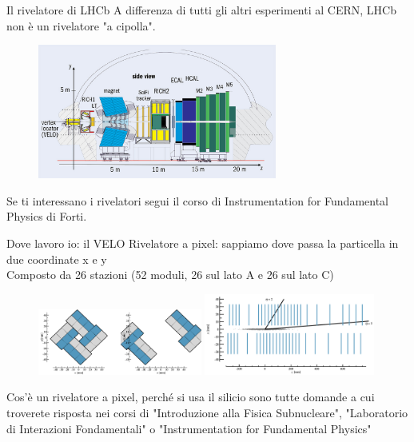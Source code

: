 \documentclass[
10pt,
aspectratio=169,
]{beamer}
\begin{document}
\begin{frame}{Il rivelatore di LHCb}
A differenza di tutti gli altri esperimenti al CERN, LHCb non è un rivelatore "a cipolla".
\begin{figure}
    \centering
    \includegraphics[width=0.7\textwidth]{figures/detector.jpeg}
\end{figure}    
Se ti interessano i rivelatori segui il corso di Instrumentation for Fundamental Physics di Forti.
\end{frame}

\begin{frame}{Dove lavoro io: il VELO}
    Rivelatore a pixel: sappiamo dove passa la particella in due coordinate x e y\\
    Composto da 26 stazioni (52 moduli, 26 sul lato A e 26 sul lato C)
    \begin{figure}
        \centering
        \includegraphics[width=0.48\textwidth]{figures/aperture.png}
        \includegraphics[width=0.5\textwidth]{figures/above_view.png}
    \end{figure}
    \vfill
    Cos'è un rivelatore a pixel, perché si usa il silicio sono tutte domande a cui troverete risposta nei corsi di "Introduzione alla Fisica Subnucleare", "Laboratorio di Interazioni Fondamentali" o "Instrumentation for Fundamental Physics"
\end{frame}
\end{document}
